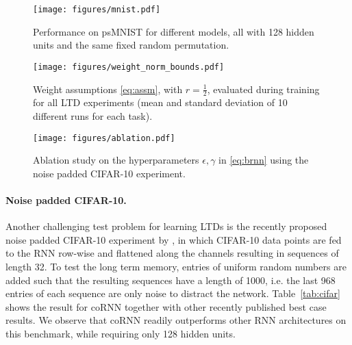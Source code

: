 \documentclass{article} \usepackage{iclr2021_conference,times}
\newcommand{\Tref}[1]{Table~\ref{#1}}
\begin{document}
\begin{figure}[ht!]
\centering
\begin{minipage}[t]{.32\textwidth}
\texttt{[image: figures/mnist.pdf]}
\caption{Performance on psMNIST for different models, all with 128 hidden units and the same fixed random permutation.}
\label{fig:mnist}
\end{minipage}\hspace{0.01\textwidth}
\begin{minipage}[t]{.32\textwidth}
\texttt{[image: figures/weight\_norm\_bounds.pdf]}
\caption{Weight assumptions \eqref{eq:assm}, with $r=\frac{1}{2}$, evaluated during training for all LTD experiments (mean and standard deviation of 10 different runs for each task).}
\label{fig:weight_assumptions}
\end{minipage}\hspace{0.01\textwidth}
\begin{minipage}[t]{.32\textwidth}
\texttt{[image: figures/ablation.pdf]}
\caption{Ablation study on the hyperparameters $\epsilon,\gamma$ in \eqref{eq:brnn} using the noise padded CIFAR-10 experiment.}
\label{fig:ablation}
\end{minipage}
\end{figure}

\paragraph{Noise padded CIFAR-10.}
Another challenging test problem for learning LTDs is the recently proposed noise padded CIFAR-10 experiment by \cite{anti}, in which CIFAR-10 data points \citep{cifar} are fed to the RNN row-wise and flattened along the channels resulting in sequences of length 32. To test the long term memory, entries of uniform random numbers are added such that the resulting sequences have a length of 1000, i.e. the last 968 entries of each sequence are only noise to distract the network. 
\Tref{tab:cifar} shows the result for coRNN together with other recently published best case results. We observe that coRNN readily outperforms other RNN architectures on this benchmark, while requiring only 128 hidden units.
\end{document}
